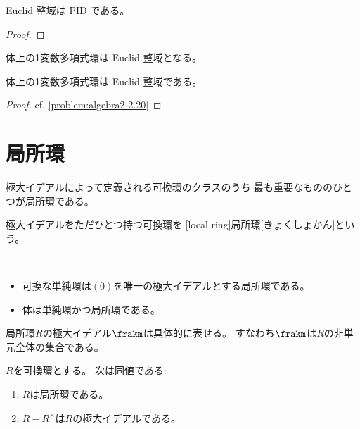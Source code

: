 \documentclass[report]{jlreq}
\begin{document}
\begin{theorem}
    Euclid 整域は PID である。
\end{theorem}

\begin{proof}
    \TODO{}
\end{proof}

体上の1変数多項式環は Euclid 整域となる。

\begin{theorem}
    体上の1変数多項式環は Euclid 整域である。
\end{theorem}

\begin{proof}
    cf. \cref{problem:algebra2-2.20}
\end{proof}


%
\section{局所環}

極大イデアルによって定義される可換環のクラスのうち
最も重要なもののひとつが局所環である。

\begin{definition}[局所環]
    極大イデアルをただひとつ持つ可換環を
    [local ring]{局所環}[きょくしょかん]という。
\end{definition}

\begin{example}[単純環と局所環の例]
    ~
    \begin{itemize}
        \item 可換な単純環は$(0)$を唯一の極大イデアルとする局所環である。
        \item 体は単純環かつ局所環である。
    \end{itemize}
\end{example}

局所環$R$の極大イデアル$\frakm$は具体的に表せる。
すなわち$\frakm$は$R$の非単元全体の集合である。

\begin{theorem}[局所環の乗法群による特徴付け]
    $R$を可換環とする。
    次は同値である:
    \begin{enumerate}
        \item $R$は局所環である。
        \item $R - R^\times$は$R$の極大イデアルである。
    \end{enumerate}
\end{theorem}
\end{document}
